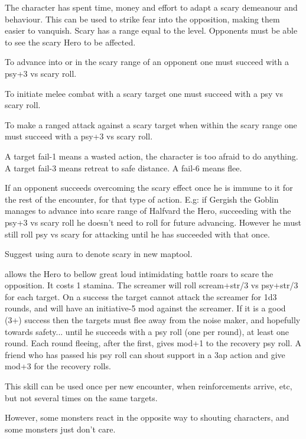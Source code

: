 \openskillslist


 The character has spent time, money and effort to adapt a scary demeanour and behaviour. This can be used to strike fear into the opposition, making them easier to vanquish. Scary has a range equal to the level. Opponents must be able to see the scary Hero to be affected.

To advance into or in the scary range of an opponent one must succeed with a psy+3 vs scary roll.

To initiate melee combat with a scary target one must succeed with a psy vs scary roll.

To make a ranged attack against a scary target when within the scary range one must succeed with a psy+3 vs scary roll.

A target fail-1 means a wasted action, the character is too afraid to do anything. A target fail-3 means retreat to safe distance. A fail-6 means flee.

If an opponent succeeds overcoming the scary effect once he is immune to it for the rest of the encounter, for that type of action. E.g: if Gergish the Goblin manages to advance into scare range of Halfvard the Hero, succeeding with the psy+3 vs scary roll he doesn't need to roll for future advancing. However he must still roll psy vs scary for attacking until he has succeeded with that once.

Suggest using aura to denote scary in new maptool.


 allows the Hero to bellow great loud intimidating battle roars to scare the opposition. It costs 1 stamina. The screamer will roll scream+str/3 vs psy+str/3 for each target. On a success the target cannot attack the screamer for 1d3 rounds, and will have an initiative-5 mod against the screamer. If it is a good (3+) success then the targets must flee away from the noise maker, and hopefully towards safety... until he succeeds with a psy roll (one per round), at least one round. Each round fleeing, after the first, gives mod+1 to the recovery psy roll. A friend who has passed his psy roll can shout support in a 3ap action and give mod+3 for the recovery rolls.

This skill can be used once per new encounter, when reinforcements arrive, etc, but not several times on the same targets.

However, some monsters react in the opposite way to shouting characters, and some monsters just don't care.


